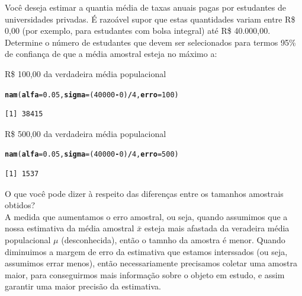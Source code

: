 \documentclass[a4paper,11pt,fleqn]{article}\usepackage[]{graphicx}\usepackage[]{color}
\makeatletter
\newcommand{\hlnum}[1]{\textcolor[rgb]{0,0,0}{#1}}%
\newcommand{\hlopt}[1]{\textcolor[rgb]{0,0,0}{\textbf{#1}}}%
\newcommand{\hlstd}[1]{\textcolor[rgb]{0,0,0}{#1}}%
\newcommand{\hlkwc}[1]{\textcolor[rgb]{0,0,0}{\textbf{#1}}}%
\newcommand{\hlkwd}[1]{\textcolor[rgb]{0,0,0}{\textbf{#1}}}%
\newenvironment{kframe}{%
 \def\at@end@of@kframe{}%
 \ifinner\ifhmode%
  \def\at@end@of@kframe{\end{minipage}}%
  \begin{minipage}{\columnwidth}%
 \fi\fi%
 \def\FrameCommand##1{\hskip\@totalleftmargin \hskip-\fboxsep
 \colorbox{shadecolor}{##1}\hskip-\fboxsep
     \hskip-\linewidth \hskip-\@totalleftmargin \hskip\columnwidth}%
 \MakeFramed {\advance\hsize-\width
   \@totalleftmargin\z@ \linewidth\hsize
   \@setminipage}}%
 {\par\unskip\endMakeFramed%
 \at@end@of@kframe}
\newenvironment{knitrout}{}{} %
\theoremstyle{definition}
\makeatother
\begin{document}
\begin{compactenum}[12.] %
\item Você deseja estimar a quantia média de taxas anuais pagas por
  estudantes de universidades privadas. É razoável supor que estas
  quantidades variam entre R\$ 0,00 (por exemplo, para estudantes com
  bolsa integral) até R\$ 40.000,00. Determine o número de estudantes
  que devem ser selecionados para termos 95\% de confiança de que a
  média amostral esteja no máximo a:
  \begin{compactenum}
  \item R\$ 100,00 da verdadeira média populacional
\begin{knitrout}\small
{}\color{fgcolor}\begin{kframe}
\begin{alltt}
\hlkwd{nam}\hlstd{(}\hlkwc{alfa} \hlstd{=} \hlnum{0.05}\hlstd{,} \hlkwc{sigma} \hlstd{= (}\hlnum{40000} \hlopt{-} \hlnum{0}\hlstd{)}\hlopt{/}\hlnum{4}\hlstd{,} \hlkwc{erro} \hlstd{=} \hlnum{100}\hlstd{)}
\end{alltt}
\begin{verbatim}
[1] 38415
\end{verbatim}
\end{kframe}
\end{knitrout}
  \item R\$ 500,00 da verdadeira média populacional
\begin{knitrout}\small
{}\color{fgcolor}\begin{kframe}
\begin{alltt}
\hlkwd{nam}\hlstd{(}\hlkwc{alfa} \hlstd{=} \hlnum{0.05}\hlstd{,} \hlkwc{sigma} \hlstd{= (}\hlnum{40000} \hlopt{-} \hlnum{0}\hlstd{)}\hlopt{/}\hlnum{4}\hlstd{,} \hlkwc{erro} \hlstd{=} \hlnum{500}\hlstd{)}
\end{alltt}
\begin{verbatim}
[1] 1537
\end{verbatim}
\end{kframe}
\end{knitrout}
  \end{compactenum}
  O que você pode dizer à respeito das diferenças entre os tamanhos
  amostrais obtidos?\\
A medida que aumentamos o erro amostral, ou seja, quando assumimos que a
nossa estimativa da média amostral $\bar{x}$ esteja mais afastada da
veradeira média populacional $\mu$ (desconhecida), então o tamnho da
amostra é menor. Quando diminuimos a margem de erro da estimativa que
estamos interssados (ou seja, assumimos errar menos), então
necessariamente precisamos coletar uma amostra maior, para conseguirmos
mais informação sobre o objeto em estudo, e assim garantir uma maior
precisão da estimativa.
\end{compactenum}
\end{document}
